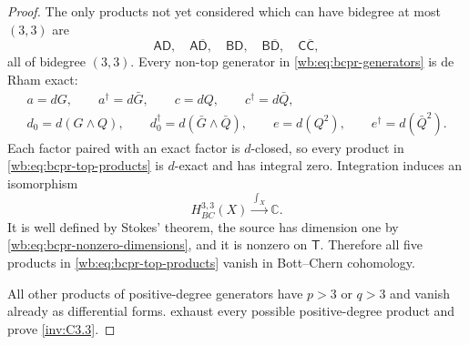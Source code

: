 \begin{proof}
The only products not yet considered which can have bidegree at most
$(3,3)$ are
\begin{equation}
 \mathsf A\mathsf D,\quad
 \mathsf A\overline{\mathsf D},\quad
 \mathsf B\mathsf D,\quad
 \mathsf B\overline{\mathsf D},\quad
 \mathsf C\overline{\mathsf C},
\label{wb:eq:bcpr-top-products}
\end{equation}
all of bidegree $(3,3)$.  Every non-top generator in
\cref{wb:eq:bcpr-generators} is de Rham exact:
\begin{equation}
\begin{gathered}
 a=dG,\qquad a^\dagger=d\bar G,\qquad
 c=dQ,\qquad c^\dagger=d\bar Q,\\
 d_0=d(G\wedge Q),\qquad
 d_0^\dagger=d(\bar G\wedge\bar Q),\qquad
 e=d(Q^2),\qquad e^\dagger=d(\bar Q^2).
\end{gathered}
\label{wb:eq:bcpr-de-rham-primitives}
\end{equation}
Each factor paired with an exact factor is $d$-closed, so every product in
\cref{wb:eq:bcpr-top-products} is $d$-exact and has integral zero.  Integration
induces an isomorphism
\begin{equation}
 H^{3,3}_{BC}(X)\xrightarrow{\ \int_X\ }\mathbb C.
\label{wb:eq:bcpr-top-integration}
\end{equation}
It is well defined by Stokes' theorem, the source has dimension one by
\cref{wb:eq:bcpr-nonzero-dimensions}, and it is nonzero on $\mathsf T$.
Therefore all five products in \cref{wb:eq:bcpr-top-products} vanish in
Bott--Chern cohomology.

All other products of positive-degree generators have $p>3$ or $q>3$ and
vanish already as differential forms.
exhaust every possible positive-degree product
and prove \cref{inv:C3.3}.
\end{proof}



